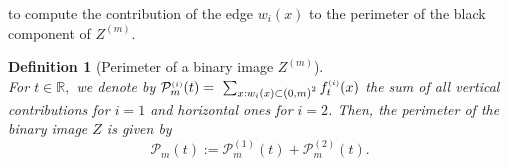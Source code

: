 \documentclass[12pt]{article}
\theoremstyle{Theorem}
\newtheorem{Definition}[Theorem]{Definition}
\begin{document}
to compute the contribution of the edge $w_i(x)$ to the perimeter of the black component of $Z^{\scriptscriptstyle (m)}$.
\begin{Definition}[Perimeter of a binary image $Z^{\scriptscriptstyle (m)}$]\label{defPerimetre}~\\
For $t\in \mathbb{R},$ we denote by $\mathcal{P}_{m}^{\scriptscriptstyle (i)}(t) =~\sum_{x: w_{i}(x) \subset \text{\larger[1]{$($}}0, m \text{\larger[1]{$)$}}^{2}} f_{t}^{\scriptscriptstyle (i)}(x)$ the  sum of all vertical contributions for $i = 1$ and horizontal ones for $i = 2$. Then, the perimeter of the binary image $Z$ is given by
\begin{equation}
\mathcal{P}_{m}(t) := \mathcal{P}_{m}^{\scriptscriptstyle (1)}(t) + \mathcal{P}_{m}^{\scriptscriptstyle (2)}(t).
 \label{eq:6}
\end{equation}
\end{Definition}
\end{document}
